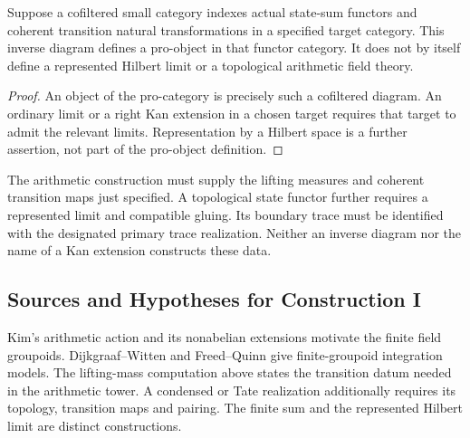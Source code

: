 \begin{theorem}
\label{v4-arith:w10-a:thm:profinite-exists}
Suppose a cofiltered small category indexes actual state-sum functors
and coherent transition natural transformations in a specified target
category. This inverse diagram defines a pro-object in that functor
category. It does not by itself define a represented Hilbert limit
or a topological arithmetic field theory.
\end{theorem}
\begin{proof}
An object of the pro-category is precisely such a cofiltered diagram.
An ordinary limit or a right Kan extension in a chosen target requires
that target to admit the relevant limits. Representation by a Hilbert
space is a further assertion, not part of the pro-object definition.
\end{proof}

\begin{remark}
\label{v4-arith:w10-a:rem:construction-I-domain}
The arithmetic construction must supply the lifting measures and
coherent transition maps just specified. A topological state functor
further requires a represented limit and compatible gluing.
Its boundary trace must be identified with the designated primary
trace realization. Neither an inverse diagram nor the name of a
Kan extension constructs these data.
\end{remark}

\subsection{Sources and Hypotheses for Construction I}
\label{v4-arith:w10-a:ah:construction-I}

Kim's arithmetic action and its nonabelian extensions motivate
the finite field groupoids. Dijkgraaf--Witten and Freed--Quinn give
finite-groupoid integration models. The lifting-mass computation
above states the transition datum needed in the arithmetic tower.
A condensed or Tate realization additionally requires its topology,
transition maps and pairing. The finite sum and the represented
Hilbert limit are distinct constructions.

